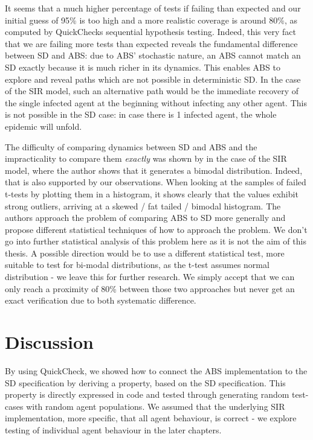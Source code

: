 It seems that a much higher percentage of tests if failing than expected and our initial guess of 95\% is too high and a more realistic coverage is around 80\%, as computed by QuickChecks sequential hypothesis testing. Indeed, this very fact that we are failing more tests than expected reveals the fundamental difference between SD and ABS: due to ABS' stochastic nature, an ABS cannot match an SD exactly because it is much richer in its dynamics. This enables ABS to explore and reveal paths which are not possible in deterministic SD. In the case of the SIR model, such an alternative path would be the immediate recovery of the single infected agent at the beginning without infecting any other agent. This is not possible in the SD case: in case there is 1 infected agent, the whole epidemic will unfold.

The difficulty of comparing dynamics between SD and ABS and the impracticality to compare them \textit{exactly} was shown by \cite{macal_agent-based_2010} in the case of the SIR model, where the author shows that it generates a bimodal distribution. Indeed, that is also supported by our observations. When looking at the samples of failed t-tests by plotting them in a histogram, it shows clearly that the values exhibit strong outliers, arriving at a skewed / fat tailed / bimodal histogram. %
The authors \cite{figueredo_comparing_2014} approach the problem of comparing ABS to SD more generally and propose different statistical techniques of how to approach the problem.
We don't go into further statistical analysis of this problem here as it is not the aim of this thesis. A possible direction would be to use a different statistical test, more suitable to test for bi-modal distributions, as the t-test assumes normal distribution - we leave this for further research. We simply accept that we can only reach a proximity of 80\% between those two approaches but never get an exact verification due to both systematic difference.

\section{Discussion}
By using QuickCheck, we showed how to connect the ABS implementation to the SD specification by deriving a property, based on the SD specification. This property is directly expressed in code and tested through generating random test-cases with random agent populations. We assumed that the underlying SIR implementation, more specific, that all agent behaviour, is correct - we explore testing of individual agent behaviour in the later chapters.

